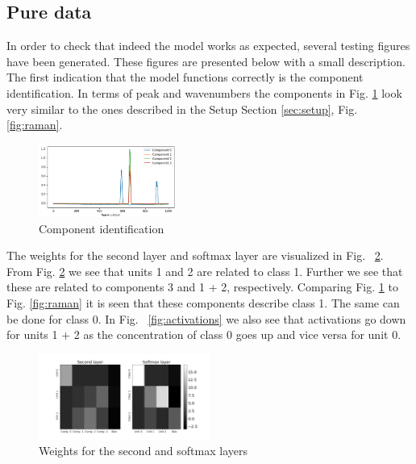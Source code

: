 \documentclass{article}
\begin{document}
\subsection{Pure data}
In order to check that indeed the model works as expected, several testing figures have been generated. These figures are presented below with a small description.\\
The first indication that the model functions correctly is the component identification. In terms of peak and wavenumbers the components in Fig. \ref{fig:components} look very similar to the ones described in the Setup Section \ref{sec:setup}, Fig. \ref{fig:raman}. 
\begin{figure}[H]
	\centering
	\includegraphics[width=0.4\textwidth]{raman_sim_3_encode_layer_1_finetune_13.png}
	\caption{Component identification}
	\label{fig:components}
\end{figure}
%

The weights for the second layer and softmax layer are visualized in Fig. ~\ref{fig:weights}. From Fig. \ref{fig:weights} we see that units 1 and 2 are related to class 1. Further we see that these are related to components 3 and 1 + 2, respectively. Comparing Fig. \ref{fig:components} to Fig. \ref{fig:raman} it is seen that these components describe class 1. The same can be done for class 0. In Fig. ~\ref{fig:activations} we also see that activations go down for units 1 + 2 as the concentration of class 0 goes up and vice versa for unit 0.\\ 
%
\begin{figure}[H]
	\includegraphics[width=0.5\textwidth]{raman_sim_second_softmax_encode_2.png}
	\caption{Weights for the second and softmax layers}
	\label{fig:weights}
\end{figure}
%
\end{document}
